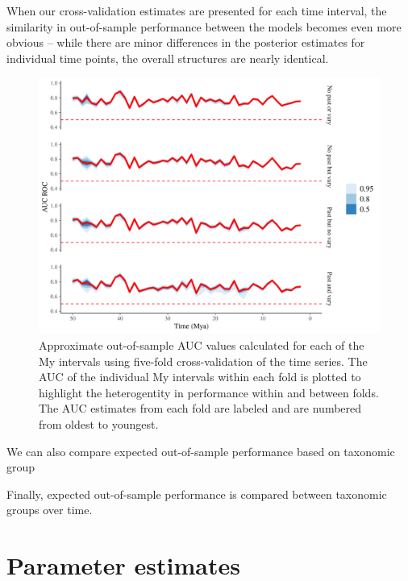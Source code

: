 \documentclass[12pt,letterpaper]{article}
\begin{document}
When our cross-validation estimates are presented for each time interval, the similarity in out-of-sample performance between the models becomes even more obvious -- while there are minor differences in the posterior estimates for individual time points, the overall structures are nearly identical. 

\begin{figure}[ht]
  \centering
  \includegraphics[width=\textwidth,height=0.5\textheight,keepaspectratio=true]{../results/figure/fold_auc_time}
  \caption{Approximate out-of-sample AUC values calculated for each of the My intervals using five-fold cross-validation of the time series. The AUC of the individual My intervals within each fold is plotted to highlight the heterogentity in performance within and between folds. The AUC estimates from each fold are labeled and are numbered from oldest to youngest.}
  \label{fig:fold_auc_time}
\end{figure}


We can also compare expected out-of-sample performance based on taxonomic group


Finally, expected out-of-sample performance is compared between taxonomic groups over time.











\section{Parameter estimates}
\end{document}
